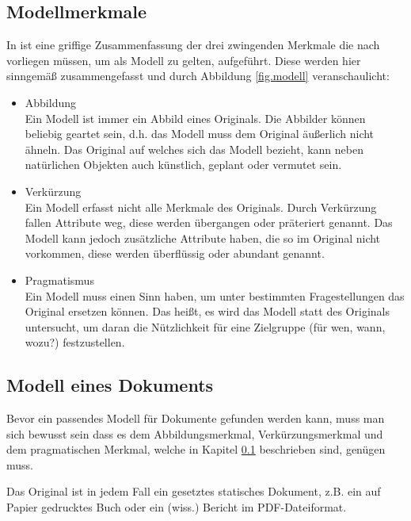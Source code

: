 \subsection{Modellmerkmale}\label{sec.modellmerkmale}

In \citep[S.~9]{ludewig} ist eine griffige Zusammenfassung der drei zwingenden Merkmale
die nach \citep{stachowiak} vorliegen müssen, um als Modell zu gelten,
aufgeführt. Diese werden hier sinngemäß zusammengefasst und durch Abbildung \ref{fig.modell}
veranschaulicht:

\begin{itemize}
  \item Abbildung \\ Ein Modell ist immer ein Abbild eines Originals.
  Die Abbilder können beliebig geartet sein, d.h. das Modell muss dem
  Original äußerlich nicht ähneln. Das Original auf welches sich das Modell
  bezieht, kann neben natürlichen Objekten auch künstlich, geplant oder vermutet sein.
  \item Verkürzung \\ Ein Modell erfasst nicht alle Merkmale des Originals.
  Durch Verkürzung fallen Attribute weg, diese werden übergangen oder präteriert genannt.
  Das Modell kann jedoch zusätzliche Attribute haben, die so im Original nicht vorkommen,
  diese werden überflüssig oder abundant genannt.
  \item Pragmatismus \\ Ein Modell muss einen Sinn haben, um unter bestimmten Fragestellungen das Original ersetzen können.
  Das heißt, es wird das Modell statt des Originals untersucht, um daran die Nützlichkeit für eine Zielgruppe (für wen, wann, wozu?) festzustellen.
\end{itemize}


\subsection{Modell eines Dokuments}

Bevor ein passendes Modell für Dokumente gefunden werden kann,
muss man sich bewusst sein dass es dem Abbildungsmerkmal,
Verkürzungsmerkmal und dem pragmatischen Merkmal,
welche in Kapitel \ref{sec.modellmerkmale} beschrieben sind, genügen muss.

Das Original ist in jedem Fall ein gesetztes statisches Dokument, z.B.
ein auf Papier gedrucktes Buch oder ein (wiss.) Bericht im PDF-Dateiformat.

